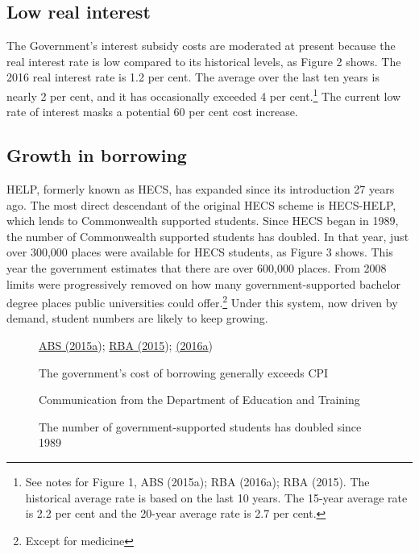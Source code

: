 \documentclass[embargoed]{grattan}
\begin{document}
\subsection{Low real interest}\label{low-real-interest}

The Government's interest subsidy costs are moderated at present because the real interest rate is low compared to its historical levels, as Figure 2 shows. The 2016 real interest rate is 1.2 per cent. The average over the last ten years is nearly 2 per cent, and it has occasionally exceeded 4 per cent.\footnote{See notes for Figure 1, ABS (2015a); RBA (2016a); RBA (2015). The historical average rate is based on the last 10 years. The 15-year average rate is 2.2 per cent and the 20-year average rate is 2.7 per cent.} The current low rate of interest masks a potential 60 per cent cost increase.

\subsection{Growth in borrowing}\label{growth-in-borrowing}

HELP, formerly known as HECS, has expanded since its introduction 27 years ago. The most direct descendant of the original HECS scheme is HECS-HELP, which lends to Commonwealth supported students. Since HECS began in 1989, the number of Commonwealth supported students has doubled. In that year, just over 300,000 places were available for HECS students, as Figure 3 shows. This year the government estimates that there are over 600,000 places. From 2008 limits were progressively removed on how many government-supported bachelor degree places public universities could offer.\footnote{Except for medicine} Under this system, now driven by demand, student numbers are likely to keep growing.


\begin{figure}
\caption{The government's cost of borrowing generally exceeds CPI}\label{fig:fig2-governments-cost-of-borrowing-exceeds-CPI}

%
{\protect\hyperlink{_ENREF_2}{ABS (2015a}); \protect\hyperlink{_ENREF_67}{RBA (2015}); \protect\hyperlink{_ENREF_68}{(2016a})}
\end{figure}

\begin{figure}
\caption{The number of government-supported students has doubled since 1989}\label{fig:fig3-number-govt-supported-students-doubled-since-1989}

%
{Communication from the Department of Education and Training}
\end{figure}
\end{document}
